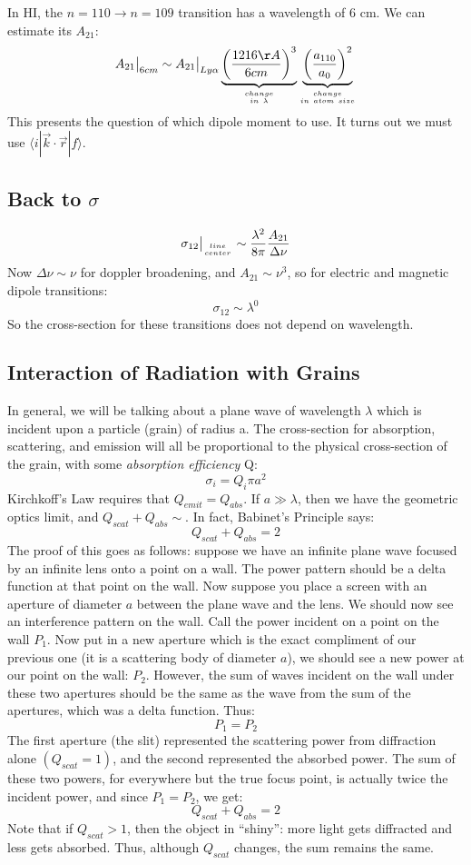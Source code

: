 \documentclass[11pt]{article}
\def\sigot{\sigma_{12}}
\def\eval#1{\big|_{#1}}
\def\ato{{A_{21}}}
\begin{document}
In HI, the $n=110\to n=109$ transition has a wavelength of 6 cm.  We can
estimate its $\ato$:
$$\ato\eval{6cm}\sim\ato\eval{Ly\alpha}
\underbrace{\left({1216\AA\over6cm}\right)^3}_{change\atop in\ \lambda}
\underbrace{\left({a_{110}\over a_0}\right)^2}_{change\atop in\ atom\ size}$$
\def\bra#1{\langle #1|}
\def\ket#1{|#1\rangle}
This presents the question of which dipole moment to use.  It turns out
we must use $\bra{i}\vec k\cdot\vec r\ket{f}$.

\subsection*{ Back to $\sigma$}

$$\sigot\eval{line\atop center}\sim{\lambda^2\over8\pi}{\ato\over\Delta\nu}$$
Now $\Delta\nu\sim\nu$ for doppler broadening, and $\ato\sim\nu^3$, so for
electric and magnetic dipole transitions:
$$\sigot\sim\lambda^0$$
So the cross-section for these transitions does not depend on wavelength.

\subsection*{ Interaction of Radiation with Grains}

In general, we will be talking about a plane wave of wavelength $\lambda$
which is incident upon a particle (grain) of radius a.  The cross-section
for absorption, scattering, and emission will all be proportional to the
physical cross-section of the grain, with some {\it absorption efficiency}
Q:
$$\sigma_i=Q_i\pi a^2$$
Kirchkoff's Law requires that $Q_{emit}=Q_{abs}$.  If $a\gg\lambda$, then
\def\qscat{Q_{scat}}
\def\qabs{Q_{abs}}
we have the geometric optics limit, and $\qscat+\qabs\sim$.  In fact,
Babinet's Principle says:
$$\boxed{\qscat+\qabs=2}$$
The proof of this goes as follows: suppose we have an infinite plane wave
focused by an infinite lens onto a point on a wall.  The power pattern
should be a delta function at that point on the wall.  Now suppose you
place a screen with an aperture of diameter $a$ between the plane wave
and the lens.  We should now see an interference pattern on the wall.  Call
the power incident on a point on the wall $P_1$.  Now put in a new aperture
which is the exact compliment of our previous one (it is a scattering
body of diameter $a$), we should see a new power at our point on the wall: 
$P_2$.
However, the sum of waves incident on the wall under these two apertures
should be the same as the wave from the sum of the apertures, which was
a delta function.  Thus:
$$P_1=P_2$$
The first aperture (the slit) represented the scattering power from 
diffraction alone $(\qscat=1)$, and the second represented the absorbed 
power.  The sum of these two powers, for everywhere but the true focus
point, is actually twice the incident power, and since $P_1=P_2$, we
get:
$$\qscat+\qabs=2$$
Note that if $\qscat>1$, then the object in ``shiny'': more light gets
diffracted and less gets absorbed.  Thus, although $\qscat$ changes,
the sum remains the same.
\end{document}
